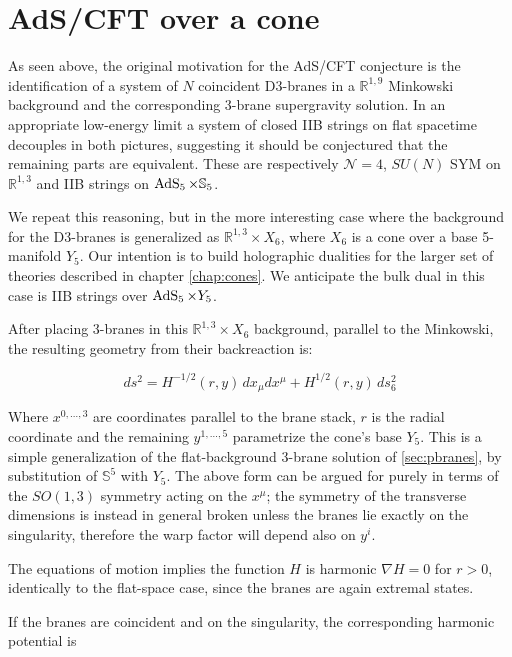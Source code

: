 \section{AdS/CFT over a cone}

As seen above, the original motivation for the AdS/CFT conjecture is the identification of a system of $N$ coincident D3-branes in a $\mathbb{R}^{1,9}$ Minkowski background and the corresponding 3-brane supergravity solution. In an appropriate low-energy limit a system of closed IIB strings on flat spacetime decouples in both pictures, suggesting it should be conjectured that the remaining parts are equivalent. These are respectively $\mathcal{N}=4$, $SU(N)$ SYM on $\mathbb{R}^{1,3}$ and IIB strings on $\operatorname{AdS}_{5} \times \mathbb{S}_5$.

We repeat this reasoning, but in the more interesting case where the background for the D3-branes is generalized as $\mathbb{R}^{1,3} \times X_6$, where $X_6$ is a cone over a base 5-manifold $Y_5$. Our intention is to build holographic dualities for the larger set of theories described in chapter \ref{chap:cones}. We anticipate the bulk dual in this case is IIB strings over $\operatorname{AdS}_{5} \times Y_5$.

After placing 3-branes in this $\mathbb{R}^{1,3} \times X_6$ background, parallel to the Minkowski, the resulting geometry from their backreaction is:

\begin{equation}
	ds^2 = H^{-1/2}(r,y) \, dx_\mu dx^\mu + H^{1/2}(r,y) \, ds_6^2 \label{warpedcone}
\end{equation}

Where $x^{0,\ldots,3}$ are coordinates parallel to the brane stack, $r$ is the radial coordinate and the remaining $y^{1,\ldots,5}$ parametrize the cone's base $Y_5$. This is a simple generalization of the flat-background 3-brane solution of \ref{sec:pbranes}, by substitution of $\mathbb{S}^5$ with $Y_5$. The above form can be argued for purely in terms of the $SO(1,3)$ symmetry acting on the $x^\mu$; the symmetry of the transverse dimensions is instead in general broken unless the branes lie exactly on the singularity, therefore the warp factor will depend also on $y^i$.

The equations of motion implies the function $H$ is harmonic $\nabla H = 0$ for $r>0$, identically to the flat-space case, since the branes are again extremal states.

If the branes are coincident and on the singularity, the corresponding harmonic potential is

